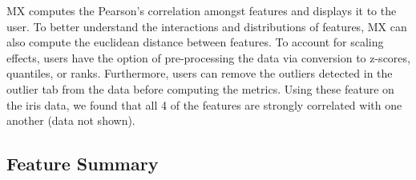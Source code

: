 \documentclass[review]{siamart0516}
\begin{document}
MX computes the Pearson's correlation amongst features and displays it to the user. To better understand the interactions and distributions of features, MX can also compute the euclidean distance between features. To account for scaling effects, users have the option of pre-processing the data via conversion to z-scores, quantiles, or ranks. Furthermore, users can remove the outliers detected in the outlier tab from the data before computing the metrics. Using these feature on the iris data, we found that all 4 of the features are strongly correlated with one another (data not shown).

\subsection{Feature Summary}
\label{subsec:SubSecFeature}
\end{document}
